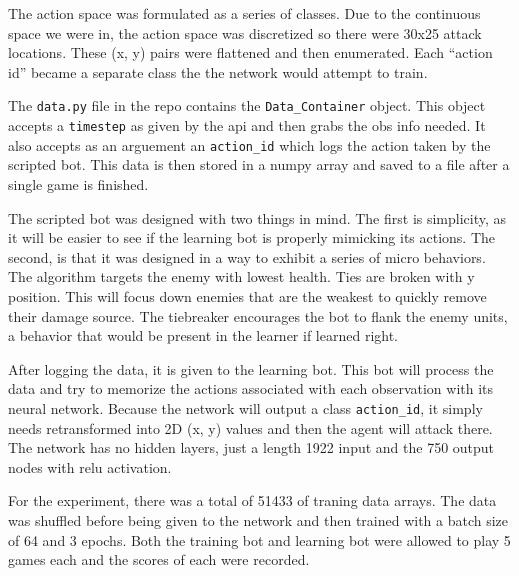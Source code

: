 \documentclass{amsart}
\newcounter{temp}
\theoremstyle{definition}
\begin{document}
The action space was formulated as a series of classes.
Due to the continuous space we were in, the action space was discretized so there were 30x25 attack locations.
These (x, y) pairs were flattened and then enumerated.
Each ``action id'' became a separate class the the network would attempt to train.

The {\tt data.py} file in the repo contains the {\tt Data\_Container} object.
This object accepts a {\tt timestep} as given by the api and then grabs the obs info needed.
It also accepts as an arguement an {\tt action\_id} which logs the action taken by the scripted bot.
This data is then stored in a numpy array and saved to a file after a single game is finished.

The scripted bot was designed with two things in mind.
The first is simplicity, as it will be easier to see if the learning bot is properly mimicking its actions.
The second, is that it was designed in a way to exhibit a series of micro behaviors.
The algorithm targets the enemy with lowest health.
Ties are broken with y position.
This will focus down enemies that are the weakest to quickly remove their damage source.
The tiebreaker encourages the bot to flank the enemy units, a behavior that would be present in the learner if learned right.

After logging the data, it is given to the learning bot.
This bot will process the data and try to memorize the actions associated with each observation with its neural network.
Because the network will output a class {\tt action\_id}, it simply needs retransformed into 2D (x, y) values and then the agent will attack there.
The network has no hidden layers, just a length 1922 input and the 750 output nodes with relu activation.

For the experiment, there was a total of 51433 of traning data arrays.
The data was shuffled before being given to the network and then trained with a batch size of 64 and 3 epochs.
Both the training bot and learning bot were allowed to play 5 games each and the scores of each were recorded.










\end{document}
